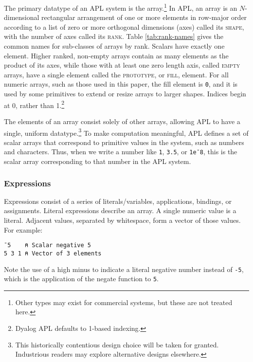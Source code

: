 \documentclass[10pt,twocolumn,english,format=sigplan,screen,balance]{acmart}
\newcommand{\noun}[1]{\textsc{#1}}
\begin{document}
The primary datatype of an APL system is the array.\footnote{Other types may exist for commercial systems, but these are not treated
here.} In APL, an array is an $N$-dimensional rectangular arrangement of
one or more elements in row-major order according to a list of zero
or more orthogonal dimensions (axes) called its \noun{shape}, with
the number of axes called its \noun{rank}. Table \ref{tab:rank-names}
gives the common names for sub-classes of arrays by rank. Scalars
have exactly one element. Higher ranked, non-empty arrays contain
as many elements as the product of its axes, while those with at least
one zero length axis, called \noun{empty} arrays, have a single element
called the \noun{prototype}, or \noun{fill}, element. For all numeric
arrays, such as those used in this paper, the fill element is \texttt{0},
and it is used by some primitives to extend or resize arrays to larger
shapes. Indices begin at 0, rather than 1.\footnote{Dyalog APL defaults to 1-based indexing.}

The elements of an array consist solely of other arrays, allowing
APL to have a single, uniform datatype.\footnote{This historically contentious design choice will be taken for granted.
Industrious readers may explore alternative designs elsewhere.} To make computation meaningful, APL defines a set of scalar arrays
that correspond to primitive values in the system, such as numbers
and characters. Thus, when we write a number like \texttt{1}, \texttt{3.5},
or \texttt{1e¯8}, this is the scalar array corresponding to that number
in the APL system.

\subsubsection{Expressions}

Expressions consist of a series of literals/variables, applications,
bindings, or assignments. Literal expressions describe an array. A
single numeric value is a literal. Adjacent values, separated by whitespace,
form a vector of those values. For example:
\begin{verbatim}
¯5    ⍝ Scalar negative 5
5 3 1 ⍝ Vector of 3 elements
\end{verbatim}
Note the use of a high minus to indicate a literal negative number
instead of \texttt{-5}, which is the application of the negate function
to \texttt{5}.
\end{document}
